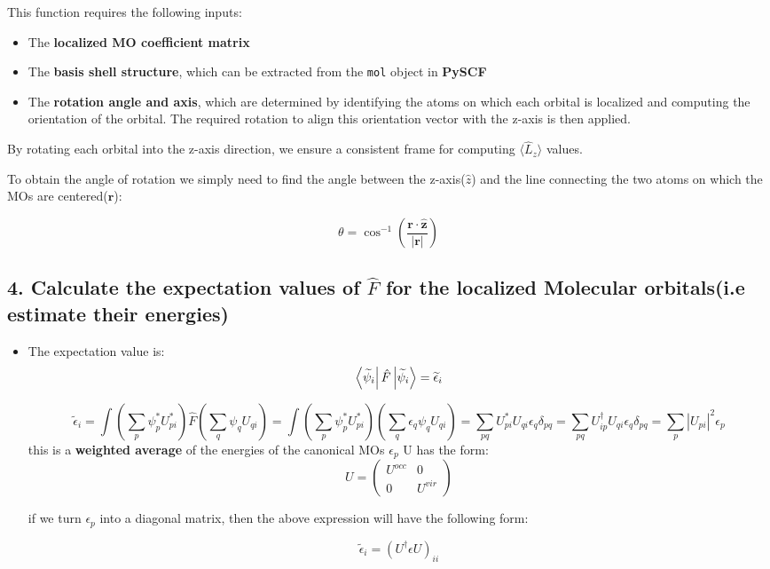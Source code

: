 \documentclass{article}
\begin{document}
\begin{itemize}
This function requires the following inputs:
\begin{itemize}
    \item The \textbf{localized MO coefficient matrix}
    \item The \textbf{basis shell structure}, which can be extracted from the \verb|mol| object in \textbf{PySCF}
    \item The \textbf{rotation angle and axis}, which are determined by identifying the atoms on which each orbital is localized and computing the orientation of the orbital. The required rotation to align this orientation vector with the z-axis is then applied.
\end{itemize}

By rotating each orbital into the z-axis direction, we ensure a consistent frame for computing $\langle \hat{L}_z \rangle$ values.

To obtain the angle of rotation we simply need to find the angle between the z-axis($\textbf{$\hat{z}$}$) and the line connecting the two atoms on which the MOs are centered($\textbf{r}$):

\[
\theta = \cos^{-1}\left( \frac{ \mathbf{r} \cdot \hat{\mathbf{z}} }{ \left| \mathbf{r} \right| } \right)
\]

\end{itemize}

\subsection*{4. Calculate the expectation values of \(\hat{F}\) for the localized Molecular orbitals(i.e estimate their energies)}

\begin{itemize}
    \item The expectation value is: 
    \[
    \bra{\widetilde{\psi}_i}\hat{F}\ket{\widetilde{\psi}_i} = \widetilde{\epsilon}_i
    \]

    \[
    \widetilde{\epsilon}_i = \int (\sum_{p} \psi_{p}^{*} U_{pi}^{*}) \hat{F}(\sum_{q} \psi_{q} U_{qi}) =
    \int (\sum_{p} \psi_{p}^{*} U_{pi}^{*})(\sum_{q} \epsilon_q \psi_{q} U_{qi}) =
    \sum_{pq} U_{pi}^{*}U_{qi}\epsilon_{q}\delta_{pq} = \sum_{pq} U_{ip}^{\dagger}U_{qi}\epsilon_{q}\delta_{pq} = \sum_{p} |U_{pi}|^{2}\epsilon_{p}
    \]
    this is a \textbf{weighted average} of the energies of the canonical MOs $\epsilon_p$
    U has the form:
    \[ U =  
    \begin{pmatrix}
    U^{occ} & 0 \\
    0 & U^{vir}
    \end{pmatrix}   
    \]

    if we turn $\epsilon_p$ into a diagonal matrix, then the above expression will have the following form:

    \[
    \widetilde{\epsilon}_i = (U^{\dagger}\epsilon U)_{ii}
    \]

\end{itemize}
\end{document}
